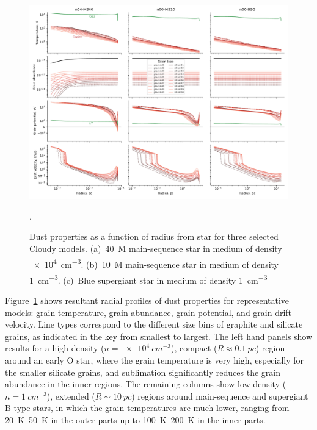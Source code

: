 \begin{figure}
  \includegraphics[width=\linewidth]{figs/multi-dustprops}
  \caption{Dust properties as a function of radius from star for three
    selected Cloudy models. (a)~\SI{40}{M_\odot} main-sequence star in
    medium of density \SI{e4}{cm^{-3}}. (b)~\SI{10}{M_\odot} main-sequence
    star in medium of density \SI{1}{cm^{-3}}. (c)~Blue supergiant
    star in medium of density \SI{1}{cm^{-3}}}.
  \label{fig:multi-dustprops}
\end{figure}
Figure~\ref{fig:multi-dustprops} shows resultant radial profiles of
dust properties for representative models: grain temperature, grain
abundance, grain potential, and grain drift velocity.  Line types
correspond to the different size bins of graphite and silicate grains,
as indicated in the key from smallest to largest. The left hand panels
show results for a high-density (\(n = \SI{e4}{cm^{-3}}\)), compact
(\(R \approx \SI{0.1}{pc}\)) region around an early O star, where the grain
temperature is very high, especially for the smaller silicate grains,
and sublimation significantly reduces the grain abundance in the inner
regions.  The remaining columns show low density
(\(n = \SI{1}{cm^{-3}}\)), extended (\(R \sim \SI{10}{pc}\)) regions
around main-sequence and supergiant B-type stars, in which the grain
temperatures are much lower, ranging from \SIrange{20}{50}{K} in the
outer parts up to \SIrange{100}{200}{K} in the inner parts.

